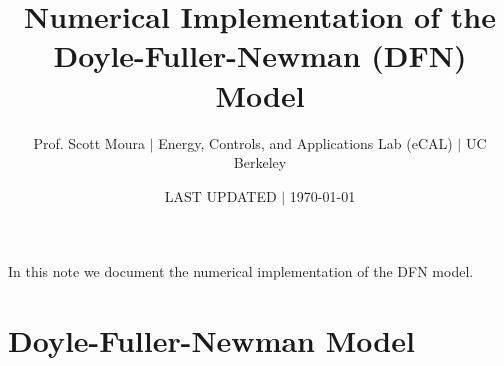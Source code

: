 \documentclass[12pt]{article}
\title{Numerical Implementation of the Doyle-Fuller-Newman (DFN) Model}
\author{{\normalsize Prof. Scott Moura} $\mid$ {\normalsize Energy, Controls, and Applications Lab (eCAL) $\mid$ UC Berkeley}}
\date{{\normalsize LAST UPDATED $\mid$ \today}}                                           %
\begin{document}
\maketitle


In this note we document the numerical implementation of the DFN model.

\section{Doyle-Fuller-Newman Model}\label{sec:dfn}
\end{document}
